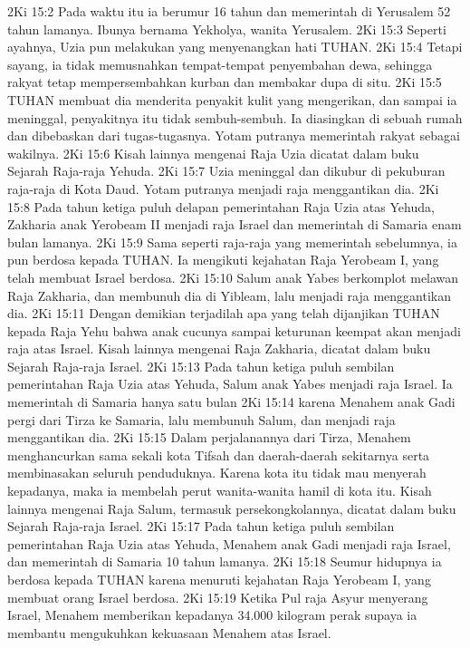 2Ki 15:2  Pada waktu itu ia berumur 16 tahun dan memerintah di Yerusalem 52 tahun lamanya. Ibunya bernama Yekholya, wanita Yerusalem.
2Ki 15:3  Seperti ayahnya, Uzia pun melakukan yang menyenangkan hati TUHAN.
2Ki 15:4  Tetapi sayang, ia tidak memusnahkan tempat-tempat penyembahan dewa, sehingga rakyat tetap mempersembahkan kurban dan membakar dupa di situ.
2Ki 15:5  TUHAN membuat dia menderita penyakit kulit yang mengerikan, dan sampai ia meninggal, penyakitnya itu tidak sembuh-sembuh. Ia diasingkan di sebuah rumah dan dibebaskan dari tugas-tugasnya. Yotam putranya memerintah rakyat sebagai wakilnya.
2Ki 15:6  Kisah lainnya mengenai Raja Uzia dicatat dalam buku Sejarah Raja-raja Yehuda.
2Ki 15:7  Uzia meninggal dan dikubur di pekuburan raja-raja di Kota Daud. Yotam putranya menjadi raja menggantikan dia.
2Ki 15:8  Pada tahun ketiga puluh delapan pemerintahan Raja Uzia atas Yehuda, Zakharia anak Yerobeam II menjadi raja Israel dan memerintah di Samaria enam bulan lamanya.
2Ki 15:9  Sama seperti raja-raja yang memerintah sebelumnya, ia pun berdosa kepada TUHAN. Ia mengikuti kejahatan Raja Yerobeam I, yang telah membuat Israel berdosa.
2Ki 15:10  Salum anak Yabes berkomplot melawan Raja Zakharia, dan membunuh dia di Yibleam, lalu menjadi raja menggantikan dia.
2Ki 15:11  Dengan demikian terjadilah apa yang telah dijanjikan TUHAN kepada Raja Yehu bahwa anak cucunya sampai keturunan keempat akan menjadi raja atas Israel. Kisah lainnya mengenai Raja Zakharia, dicatat dalam buku Sejarah Raja-raja Israel.
2Ki 15:13  Pada tahun ketiga puluh sembilan pemerintahan Raja Uzia atas Yehuda, Salum anak Yabes menjadi raja Israel. Ia memerintah di Samaria hanya satu bulan
2Ki 15:14  karena Menahem anak Gadi pergi dari Tirza ke Samaria, lalu membunuh Salum, dan menjadi raja menggantikan dia.
2Ki 15:15  Dalam perjalanannya dari Tirza, Menahem menghancurkan sama sekali kota Tifsah dan daerah-daerah sekitarnya serta membinasakan seluruh penduduknya. Karena kota itu tidak mau menyerah kepadanya, maka ia membelah perut wanita-wanita hamil di kota itu. Kisah lainnya mengenai Raja Salum, termasuk persekongkolannya, dicatat dalam buku Sejarah Raja-raja Israel.
2Ki 15:17  Pada tahun ketiga puluh sembilan pemerintahan Raja Uzia atas Yehuda, Menahem anak Gadi menjadi raja Israel, dan memerintah di Samaria 10 tahun lamanya.
2Ki 15:18  Seumur hidupnya ia berdosa kepada TUHAN karena menuruti kejahatan Raja Yerobeam I, yang membuat orang Israel berdosa.
2Ki 15:19  Ketika Pul raja Asyur menyerang Israel, Menahem memberikan kepadanya 34.000 kilogram perak supaya ia membantu mengukuhkan kekuasaan Menahem atas Israel.
